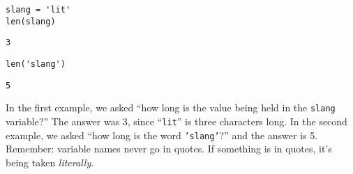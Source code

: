 \begin{Verbatim}[fontsize=\small,samepage=true,frame=single,framesep=3mm]
slang = 'lit'
len(slang)
\end{Verbatim}
\begin{Verbatim}[fontsize=\small,samepage=true,frame=leftline,framesep=5mm,framerule=1mm]
3
\end{Verbatim}
\begin{Verbatim}[fontsize=\small,samepage=true,frame=single,framesep=3mm]
len('slang')
\end{Verbatim}
\begin{Verbatim}[fontsize=\small,samepage=true,frame=leftline,framesep=5mm,framerule=1mm]
5
\end{Verbatim}

In the first example, we asked ``how long is the value being held in the
\texttt{slang} variable?'' The answer was 3, since ``\texttt{lit}'' is three
characters long. In the second example, we asked ``how long is the word
\texttt{'slang'}?'' and the answer is 5. Remember: variable names never go in
quotes. If something is in quotes, it's being taken \textit{literally}.
